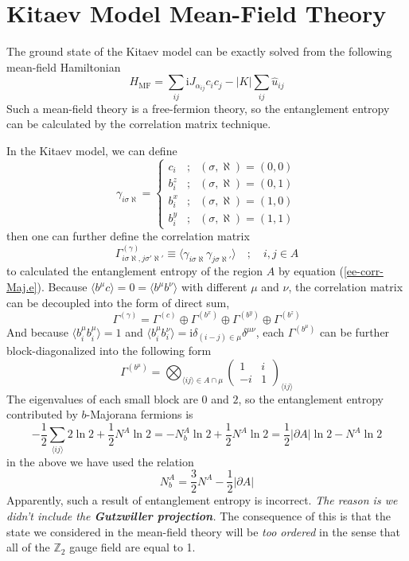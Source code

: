 \documentclass[12font]{article}
\theoremstyle{definition}
\numberwithin{equation}{section}
\newcommand{\anglelr}[1]{\langle #1 \rangle}
\newcommand{\abs}[1]{\left|  #1  \right|}
\newcommand{\de}{\partial}
\newcommand{\mrm}[1]{\mathrm{#1}}
\newcommand{\im}{\mrm{i}}
\begin{document}
\section{Kitaev Model Mean-Field Theory}
The ground state of the Kitaev model can be exactly solved from the following mean-field Hamiltonian
\[
H_{\mrm{MF}} = \sum_{ij}\im J_{\alpha_{ij}}c_ic_j -\abs{K}\sum_{ij}\hat{u}_{ij}
\]
Such a mean-field theory is a free-fermion theory, so the entanglement entropy can be calculated by the correlation matrix technique.

In the Kitaev model, we can define 
\[
\gamma_{i\sigma\aleph} = 
\left\{
\begin{array}{ccc}
  c_i & ; & (\sigma,\aleph)=(0,0) \\
  b^z_i & ; & (\sigma,\aleph)=(0,1) \\
  b^x_i & ; & (\sigma,\aleph)=(1,0) \\
  b^y_i & ; & (\sigma,\aleph)=(1,1) 
\end{array}
\right.
\]
then one can further define the correlation matrix
\[
\Gamma^{(\gamma)}_{i\sigma\aleph,j\sigma'\aleph'} \equiv \anglelr{\gamma_{i\sigma\aleph}\gamma_{j\sigma\aleph'}} \quad;\quad i,j \in A
\]
to calculated the entanglement entropy of the region $A$ by equation (\ref{ee-corr-Maj.e}). Because $\anglelr{b^\mu c}=0=\anglelr{b^\mu b^\nu}$ with different $\mu$ and $\nu$, the correlation matrix can be decoupled into the form of direct sum,
\[
\Gamma^{(\gamma)} = \Gamma^{(c)}\oplus\Gamma^{(b^x)}\oplus\Gamma^{(b^y)}\oplus\Gamma^{(b^z)}
\]
And because $\anglelr{b_i^\mu b_i^\mu} = 1$ and $\anglelr{b_i^\mu b_i^\nu} = \im\delta_{(i-j)\in\mu}\delta^{\mu\nu}$, each $\Gamma^{(b^\mu)}$ can be further block-diagonalized into the following form
\[
\Gamma^{(b^\mu)} = \bigotimes_{\anglelr{ij}\in A\cap\mu} 
\begin{pmatrix}
  1 & i \\
  -i & 1 
\end{pmatrix}_{\anglelr{ij}}
\]
The eigenvalues of each small block are $0$ and $2$, so the entanglement entropy contributed by $b$-Majorana fermions is
\[
-\frac{1}{2}\sum_{\anglelr{ij}}2\ln 2 + \frac{1}{2}N^A\ln 2 = -N^A_b\ln 2 + \frac{1}{2}N^A\ln 2 = \frac{1}{2}\abs{\de A}\ln 2 - N^A\ln 2
\]
in the above we have used the relation
\[
N^A_b = \frac{3}{2}N^A - \frac{1}{2}\abs{\de A}
\]
Apparently, such a result of entanglement entropy is incorrect. \emph{The reason is we didn't include the \textbf{Gutzwiller projection}.} The consequence of this is that the state we considered in the mean-field theory will be \emph{too ordered} in the sense that all of the $\mathbb{Z}_2$ gauge field are equal to 1. 
\end{document}
